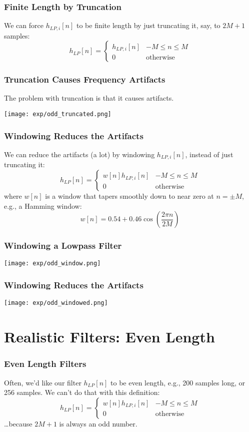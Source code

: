 \documentclass{beamer}
\begin{document}
\begin{frame}
  \frametitle{Finite Length by Truncation}

  We can force $h_{LP,i}[n]$ to be finite length by just truncating it,
  say, to $2M+1$ samples:
  \[
  h_{LP}[n] = \begin{cases}
    h_{LP,i}[n] & -M\le n\le M\\
    0 &\mbox{otherwise}
  \end{cases}
  \]
\end{frame}

\begin{frame}
  \frametitle{Truncation Causes Frequency Artifacts}

  The problem with truncation is that it causes artifacts.

  \centerline{\texttt{[image: exp/odd\_truncated.png]}}
\end{frame}


\begin{frame}
  \frametitle{Windowing Reduces the Artifacts}

  We can reduce the artifacts (a lot) by
  windowing $h_{LP,i}[n]$, instead of just truncating it:
  \[
  h_{LP}[n] = \begin{cases}
    w[n]h_{LP,i}[n] & -M\le n\le M\\
    0 &\mbox{otherwise}
  \end{cases}
  \]
  where $w[n]$ is a window that tapers smoothly down to near zero at
  $n=\pm M$, e.g., a Hamming window:
  \[
  w[n] = 0.54 + 0.46 \cos\left(\frac{2\pi n}{2M}\right)
  \]
\end{frame}

\begin{frame}
  \frametitle{Windowing a Lowpass Filter}
  \centerline{\texttt{[image: exp/odd\_window.png]}}
\end{frame}

\begin{frame}
  \frametitle{Windowing Reduces the Artifacts}

  \centerline{\texttt{[image: exp/odd\_windowed.png]}}
\end{frame}


\section[Even Length]{Realistic Filters: Even Length}
\setcounter{subsection}{1}

\begin{frame}
  \frametitle{Even Length Filters}

  Often, we'd like our filter $h_{LP}[n]$ to be even length, e.g., 200
  samples long, or 256 samples.  We can't do that with this definition:
  \[
  h_{LP}[n] = \begin{cases}
    w[n]h_{LP,i}[n] & -M\le n\le M\\
    0 &\mbox{otherwise}
  \end{cases}
  \]
  \ldots because $2M+1$ is always an odd number.
\end{frame}
\end{document}
